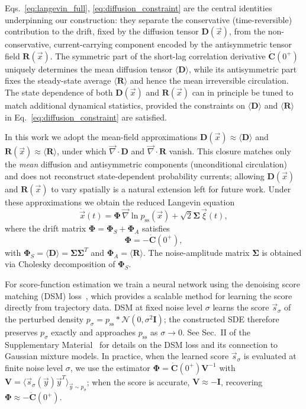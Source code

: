 \documentclass[%
  prl,
  reprint,
  amsmath,
  amssymb,
  aps
]{revtex4-2}
\newcommand{\vvec}[1]{\vec{#1}}
\begin{document}
Eqs.~\eqref{eq:langevin_full}, \eqref{eq:diffusion_constraint} are the central identities underpinning our construction: they separate the conservative (time-reversible) contribution to the drift, fixed by the diffusion tensor $\bm{D}(\vvec{x})$, from the non-conservative, current-carrying component encoded by the antisymmetric tensor field $\bm{R}(\vvec{x})$. The symmetric part of the short-lag correlation derivative $\dot{\bm{C}}(0^+)$ uniquely determines the mean diffusion tensor $\langle \bm{D} \rangle$, while its antisymmetric part fixes the steady-state average $\langle \bm{R} \rangle$ and hence the mean irreversible circulation. The state dependence of both $\bm{D}(\vvec{x})$ and $\bm{R}(\vvec{x})$ can in principle be tuned to match additional dynamical statistics, provided the constraints on $\langle \bm{D} \rangle$ and $\langle \bm{R} \rangle$ in Eq.~\eqref{eq:diffusion_constraint} are satisfied.

In this work we adopt the mean-field approximations $\bm{D}(\vvec{x}) \approx \langle \bm{D} \rangle$ and $\bm{R}(\vvec{x}) \approx \langle \bm{R} \rangle$, under which $\vvec{\nabla} \cdot \bm{D}$ and $\vvec{\nabla} \cdot \bm{R}$ vanish. This closure matches only the \emph{mean} diffusion and antisymmetric components (unconditional circulation) and does not reconstruct state-dependent probability currents; allowing $\bm{D}(\vvec{x})$ and $\bm{R}(\vvec{x})$ to vary spatially is a natural extension left for future work. Under these approximations we obtain the reduced Langevin equation
\begin{equation}
\label{eq:langevin_phi}
\dot{\vvec{x}}(t) = \bm{\Phi}\,\vvec{\nabla} \ln p_{\mathrm{ss}}(\vvec{x}) + \sqrt{2}\bm{\Sigma}\,\vvec{\xi}(t),
\end{equation}
where the drift matrix $\bm{\Phi} = \bm{\Phi}_S + \bm{\Phi}_A$ satisfies
\begin{equation}
\label{eq:phi_from_correlation}
\bm{\Phi} = -\dot{\bm{C}}(0^+),
\end{equation}
with $\bm{\Phi}_S = \langle \bm{D} \rangle = \bm{\Sigma}\bm{\Sigma}^T$ and $\bm{\Phi}_A = \langle \bm{R} \rangle$. The noise-amplitude matrix $\bm{\Sigma}$ is obtained via Cholesky decomposition of $\bm{\Phi}_S$.

For score-function estimation we train a neural network using the denoising score matching (DSM) loss~\cite{Vincent2011,SongSohlDicksteinKingma2021}, which provides a scalable method for learning the score directly from trajectory data. DSM at fixed noise level $\sigma$ learns the score $\vvec{s}_\sigma$ of the perturbed density $p_\sigma = p_{\mathrm{ss}}\ast \mathcal{N}(0,\sigma^2\bm{I})$; the constructed SDE therefore preserves $p_\sigma$ exactly and approaches $p_{\mathrm{ss}}$ as $\sigma\to 0$. See Sec.~II of the Supplementary Material~\cite{SM} for details on the DSM loss and its connection to Gaussian mixture models. In practice, when the learned score $\vvec{s}_\sigma$ is evaluated at finite noise level $\sigma$, we use the estimator $\bm{\Phi}=\dot{\bm{C}}(0^+)\bm{V}^{-1}$ with $\bm{V}=\langle \vvec{s}_\sigma(\vvec{y})\vvec{y}^T\rangle_{\vvec{y}\sim p_\sigma}$; when the score is accurate, $\bm{V}\approx -\bm{I}$, recovering $\bm{\Phi}\approx -\dot{\bm{C}}(0^+)$.
\end{document}
